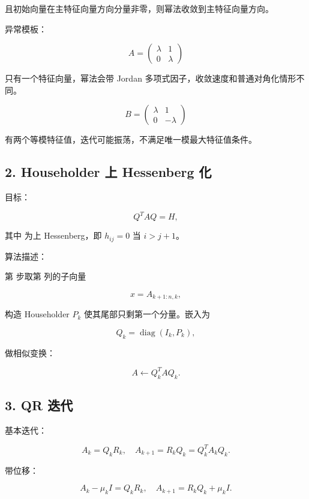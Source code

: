 \documentclass[11pt,a4paper]{ctexart}
\newcommand{\code}[1]{\begingroup\ttfamily\small #1\endgroup}
\begin{document}
且初始向量在主特征向量方向分量非零，则幂法收敛到主特征向量方向。

异常模板：

\[
A=\begin{pmatrix}\lambda&1\\0&\lambda\end{pmatrix}
\]

只有一个特征向量，幂法会带 Jordan 多项式因子，收敛速度和普通对角化情形不同。

\[
B=\begin{pmatrix}\lambda&1\\0&-\lambda\end{pmatrix}
\]

有两个等模特征值，迭代可能振荡，不满足唯一模最大特征值条件。


\subsection*{2. Householder 上 Hessenberg 化}


目标：

\[
Q^TAQ=H,
\]

其中 \code{} 为上 Hessenberg，即 $h_{ij}=0$ 当 $i>j+1$。

算法描述：

第 \code{} 步取第 \code{\detokenize{k}} 列的子向量

\[
x=A_{k+1:n,k},
\]

构造 Householder $P_k$ 使其尾部只剩第一个分量。嵌入为

\[
Q_k=\operatorname{diag}(I_k,P_k),
\]

做相似变换：

\[
A\leftarrow Q_k^T A Q_k.
\]


\subsection*{3. QR 迭代}


基本迭代：

\[
A_k=Q_kR_k,\quad A_{k+1}=R_kQ_k=Q_k^TA_kQ_k.
\]

带位移：

\[
A_k-\mu_k I=Q_kR_k,\quad
A_{k+1}=R_kQ_k+\mu_k I.
\]
\end{document}
